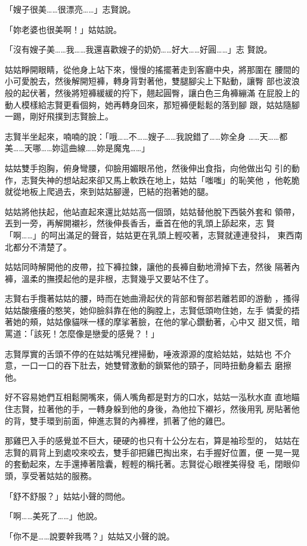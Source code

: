 「嫂子很美……很漂亮……」志賢說。

「妳老婆也很美啊！」姑姑說。

「沒有嫂子美……我……我還喜歡嫂子的奶奶……好大……好圓……」志
賢說。

姑姑睜開眼睛，從他身上站下來，慢慢的搖擺著走到客廳中央，將那圍在
腰間的小可愛脫去，然後解開短褲，轉身背對著他，雙腿腳尖上下點動，讓臀
部也波浪般的起伏著，然後將短褲緩緩的捋下，翹起圓臀，讓白色三角褲繃滿
在屁股上的動人模樣給志賢更看個夠，她再轉身回來，那短褲便鬆鬆的落到腳
跟，姑姑隨腳一踢，剛好飛撲到志賢臉上。

志賢半坐起來，喃喃的說：「哦……不……嫂子……我說錯了……妳全身
……天……都美……天哪……妳這曲線……妳是魔鬼……」

姑姑雙手抱胸，俯身彎腰，仰臉用媚眼吊他，然後伸出食指，向他做出勾
引的動作，志賢失神的想站起來卻又馬上軟跌在地上，姑姑「嗤嗤」的恥笑他
，他乾脆就從地板上爬過去，來到姑姑腳邊，巴結的抱著她的腿。

姑姑將他扶起，他站直起來還比姑姑高一個頭，姑姑替他脫下西裝外套和
領帶，丟到一旁，再解開襯衫，然後伸長香舌，垂首在他的乳頭上舔起來，志
賢「啊……」的呵出滿足的聲音，姑姑更在乳頭上輕咬著，志賢就連連發抖，
東西南北都分不清楚了。

姑姑同時解開他的皮帶，拉下褲拉鍊，讓他的長褲自動地滑掉下去，然後
隔著內褲，溫柔的撫摸起他的是非根，志賢幾乎又要站不住了。

志賢右手攬著姑姑的腰，時而在她曲滑起伏的背部和臀部若離若即的游動
，搔得姑姑酸癢癢的憨笑，她仰臉斜靠在他的胸膛上，志賢低頭吻住她，左手
憐愛的捂著她的頰，姑姑像貓咪一樣的摩挲著臉，在他的掌心鑽動著，心中又
甜又慌，暗罵道：「該死！怎麼像是戀愛的感覺？！」

志賢厚實的舌頭不停的在姑姑嘴兒裡掃動，唾液源源的度給姑姑，姑姑也
不介意，一口一口的吞下肚去，她雙臂激動的鎖緊他的頸子，同時扭動身軀去
磨擦他。

好不容易她們互相鬆開嘴來，倆人嘴角都是對方的口水，姑姑一泓秋水直
直地瞄住志賢，拉著他的手，一轉身躲到他的身後，為他拉下襯衫，然後用乳
房貼著他的背，雙手環到前面，伸進志賢的內褲裡，抓著了他的雞巴。

那雞巴入手的感覺並不巨大，硬硬的也只有十公分左右，算是袖珍型的，
姑姑在志賢的肩背上到處咬來咬去，雙手卻把雞巴掏出來，右手握好位置，便
一晃一晃的套動起來，左手還捧著陰囊，輕輕的稱托著。志賢從心眼裡美得發
毛，閉眼仰頭，享受著姑姑的服務。

「舒不舒服？」姑姑小聲的問他。

「啊……美死了……」他說。

「你不是……說要幹我嗎？」姑姑又小聲的說。

